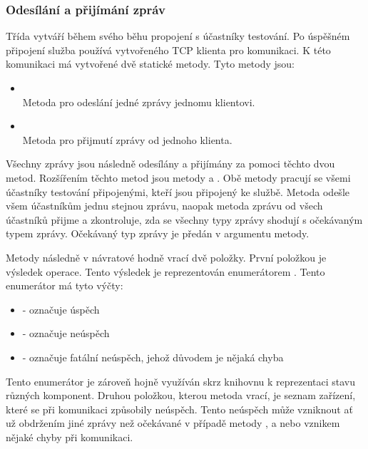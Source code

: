 \subsubsection{Odesílání a přijímání zpráv}
Třída  vytváří během svého běhu propojení s účastníky testování. Po úspěšném připojení služba používá vytvořeného TCP klienta pro komunikaci. K této komunikaci má vytvořené dvě statické metody. Tyto metody jsou:

\begin{itemize}
    \item {} \\
    Metoda pro odeslání jedné zprávy jednomu klientovi.
    \item {} \\
    Metoda pro přijmutí zprávy od jednoho klienta.
\end{itemize}

Všechny zprávy jsou následně odesílány a přijímány za pomoci těchto dvou metod. Rozšířením těchto metod jsou metody  a . Obě metody pracují se všemi účastníky testování připojenými, kteří jsou připojený ke službě. Metoda  odešle všem účastníkům jednu stejnou zprávu, naopak metoda  zprávu od všech účastníků přijme a zkontroluje, zda se všechny typy zprávy shodují s očekávaným typem zprávy. Očekávaný typ zprávy je předán v argumentu metody. 

Metody následně v návratové hodně vrací dvě položky. První položkou je výsledek operace. Tento výsledek je reprezentován enumerátorem . Tento enumerátor má tyto výčty:

\begin{itemize}
    \item {} - označuje úspěch
    \item {} - označuje neúspěch
    \item {} - označuje fatální neúspěch, jehož důvodem je nějaká chyba
\end{itemize}

Tento enumerátor je zároveň hojně využíván skrz knihovnu k reprezentaci stavu různých komponent. Druhou položkou, kterou metoda vrací, je seznam zařízení, které se při komunikaci způsobily neúspěch. 
Tento neúspěch může vzniknout ať už obdržením jiné zprávy než očekávané v případě metody , a nebo vznikem nějaké chyby při komunikaci.

